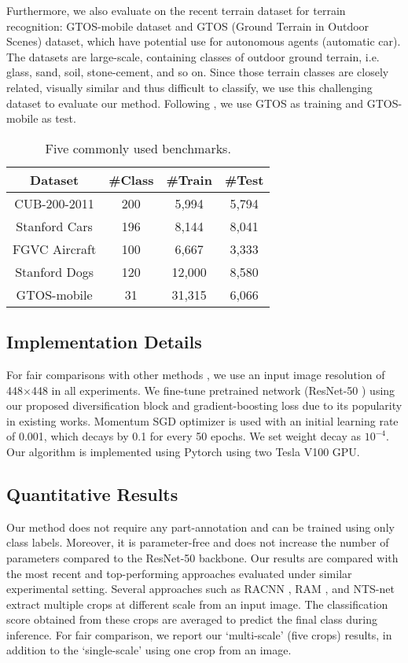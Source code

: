 \documentclass[letterpaper]{article} \usepackage{aaai20}  \usepackage{times}  \usepackage{helvet} \usepackage{courier}  \usepackage[hyphens]{url}  \usepackage{graphicx} \usepackage{multirow}
\begin{document}
Furthermore, we also evaluate on the recent terrain dataset for terrain recognition: GTOS-mobile \cite{dataset_gtosmobile} dataset and GTOS (Ground Terrain in Outdoor Scenes) \cite{dataset_gtos} dataset, which have potential use for autonomous agents (automatic car). The datasets are large-scale, containing classes of outdoor ground terrain, i.e. glass, sand, soil, stone-cement, and so on. Since those terrain classes are closely related, visually similar and thus difficult to classify, we use this challenging dataset to evaluate our method. Following \cite{dataset_gtosmobile}, we use GTOS as training and GTOS-mobile as test.
\begin{table}[h]
\centering
\begin{tabular}{|c|c|c|c|}
\hline
Dataset        & \#Class & \#Train & \#Test \\ \hline\hline
CUB-200-2011  & 200     & 5,994    & 5,794   \\ \hline
Stanford Cars  & 196     & 8,144    & 8,041   \\ \hline
FGVC Aircraft  & 100     & 6,667    & 3,333   \\ \hline
Stanford Dogs  & 120     & 12,000    & 8,580   \\ \hline
GTOS-mobile & 31     & 31,315    & 6,066   \\ \hline
\end{tabular}
\caption{Five commonly used benchmarks.}
\label{tab:dataset}
\end{table}

\subsection{Implementation Details}
For fair comparisons with other methods \cite{nts_2018,DFL_cnn_2018}, we use an input image resolution of 448$\times$448 in all experiments. 
We fine-tune pretrained network (ResNet-50 \cite{resnet_2016}) using our proposed diversification block and gradient-boosting loss due to its popularity in existing works. Momentum SGD optimizer is used with an initial learning rate of 0.001, which decays by 0.1 for every 50 epochs. We set weight decay as $10^{-4}$. Our algorithm is implemented using Pytorch \cite{paszke2017automatic} using two Tesla V100 GPU.

\subsection{Quantitative Results}
Our method does not require any part-annotation and can be trained using only class labels. Moreover, it is parameter-free and does not  increase the number of parameters compared to the ResNet-50 backbone. Our results are compared with the most recent and top-performing approaches evaluated under similar experimental setting. Several  approaches such as RACNN \cite{racnn_2017}, RAM \cite{li2017dynamic}, and NTS-net \cite{nts_2018} extract multiple crops at different scale from an input image. The classification score obtained from these crops are averaged to predict the final class during inference. For fair comparison, we report our  `multi-scale'  (five crops)  results, in addition to the  `single-scale' using one crop from an image.
\end{document}
